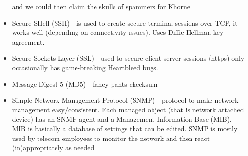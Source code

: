 \documentclass{scrartcl}
\begin{document}
\begin{itemize}
and we could then claim the skulls of spammers for Khorne.
\item Secure SHell (SSH) - is used to create secure terminal sessions over TCP,
it works well (depending on connectivity issues). Uses Diffie-Hellman key
agreement.
\item Secure Sockets Layer (SSL) - used to secure client-server sessions (https)
only occasionally has game-breaking Heartbleed bugs.
\item Message-Digest 5 (MD5) - fancy pants checksum
\item Simple Network Management Protocol (SNMP) - protocol to make
network management easy/consistent. Each managed object (that is network
attached device) has an SNMP agent and a Management Information Base (MIB).
MIB is basically a database of settings that can be edited. SNMP is mostly used
by telecom employees to monitor the network and then react (in)appropriately
as needed.
\end{itemize}
\end{document}
